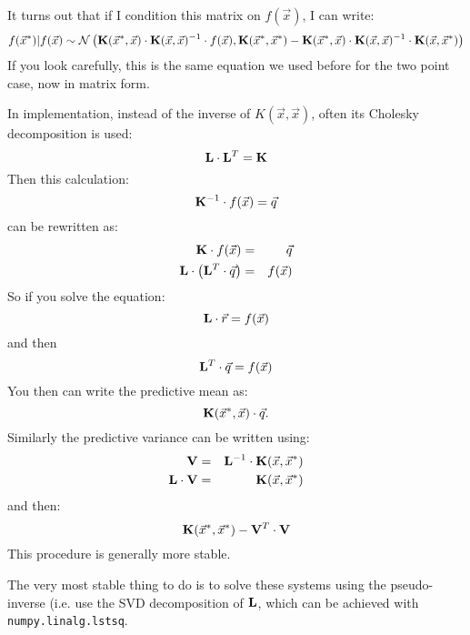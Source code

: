 It turns out that if I condition this matrix on $f(\vec{x})$, I can
write:
\begin{equation}
f(\vec{x}^\ast) | f(\vec{x}) \sim 
\mathcal{N}
\left({\bf K}(\vec{x}^\ast, \vec{x}) \cdot {\bf K}(\vec{x}, \vec{x})^{-1}
\cdot f(\vec{x}), 
{\bf K}(\vec{x}^\ast, \vec{x}^\ast)
- {\bf K}(\vec{x}^\ast, \vec{x})\cdot 
{\bf K}(\vec{x}, \vec{x})^{-1}
\cdot {\bf K}(\vec{x}, \vec{x}^\ast) \right)
\end{equation}
If you look carefully, this is the same equation we used before for
the two point case, now in matrix form.

In implementation, instead of the inverse of $K(\vec{x}, \vec{x})$,
often its Cholesky decomposition is used:
\begin{equation}
 {\bf L}\cdot{\bf L}^T = {\bf K}
\end{equation}
Then this calculation:
\begin{equation}
 {\bf K}^{-1} \cdot f(\vec{x}) = \vec{q}
\end{equation}
can be rewritten as:
\begin{eqnarray}
 {\bf K} \cdot f(\vec{x}) &=& \vec{q} \cr
 {\bf L} \cdot \left({\bf L}^T \cdot \vec{q}\right) &=&
 f(\vec{x})
\end{eqnarray}
So if you solve the equation:
\begin{equation}
 {\bf L} \cdot \vec{r} = f(\vec{x})
\end{equation}
and then 
\begin{equation}
 {\bf L}^T \cdot \vec{q} = f(\vec{x})
\end{equation}
You then can write the predictive mean as:
\begin{equation}
{\bf K}(\vec{x}^\ast, \vec{x}) \cdot \vec{q}.
\end{equation}
Similarly the predictive variance can be written using:
\begin{eqnarray}
 {\bf V} &=& {\bf L}^{-1} \cdot {\bf K}(\vec{x}, \vec{x}^\ast) \cr
 {\bf L} \cdot {\bf V} &=& 
{\bf K}(\vec{x}, \vec{x}^\ast)
\end{eqnarray}
and then:
\begin{equation}
 {\bf K}(\vec{x}^{\ast}, \vec{x}^{\ast}) - {\bf V}^T\cdot {\bf V}
\end{equation}
This procedure is generally more stable.

The very most stable thing to do is to solve these systems using the
pseudo-inverse (i.e. use the SVD decomposition of ${\bf L}$, which can
be achieved with {\tt numpy.linalg.lstsq}.
